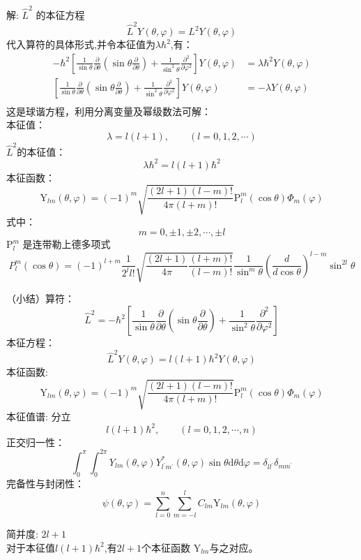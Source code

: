 \begin{frame} [allowframebreaks=]
    \alert{解:} $\hat{L}^2$ 的本征方程
    $$\hat{L}^2Y(\theta,\varphi)=L^2 Y(\theta,\varphi)$$
    代入算符的具体形式,并令本征值为$\lambda\hbar^2$,有：
    \begin{equation*}
        \begin{split}
            -\hbar^{2}\left[\frac{1}{\sin \theta} \frac{\partial}{\partial \theta}\left(\sin \theta \frac{\partial}{\partial \theta}\right)+\frac{1}{\sin ^{2} \theta} \frac{\partial^{2}}{\partial \varphi^{2}}\right] Y(\theta,\varphi)&=\lambda\hbar^2 Y(\theta,\varphi) \\
            \left[\frac{1}{\sin \theta} \frac{\partial}{\partial \theta}\left(\sin \theta \frac{\partial}{\partial \theta}\right)+\frac{1}{\sin ^{2} \theta} \frac{\partial^{2}}{\partial \varphi^{2}}\right] Y(\theta,\varphi)&=-\lambda Y(\theta,\varphi) \\
        \end{split} 
    \end{equation*}
    这是球谐方程，利用分离变量及幂级数法可解：\\
    本征值： $$\lambda=l(l+1), \qquad (l= 0,1,2,\cdots)$$
    $\hat{L}^2$的本征值：$$\lambda\hbar^2=l(l+1)\hbar^2$$
    本征函数：
    $$
    \mathrm{Y}_{l m}(\theta, \varphi)=(-1)^{m} \sqrt{\frac{(2 l+1)(l-m) !}{4 \pi(l+m) !}} \mathrm{P}_{l}^{m}(\cos \theta) \Phi_{m}(\varphi)
    $$ 
    式中：
    $$ m=0,\pm 1,  \pm 2, \cdots, \pm l  $$
    $\mathrm{P}_{l}^{m} $ 是连带勒上德多项式
    $$
    P_{l}^{m}(\cos \theta)=(-1)^{l+m} \frac{1}{2^{l} l !} \sqrt{\frac{(2 l+1)}{4 \pi} \frac{(l+m) !}{(l-m) !} } \frac{1}{\sin ^{m} \theta}\left(\frac{d}{d \cos \theta}\right)^{l-m} \sin ^{2 l} \theta
    $$
\end{frame} 

\begin{frame} [allowframebreaks=]
    （小结）算符：  $$ \hat{L}^{2}=-\hbar^{2}\left[\frac{1}{\sin \theta} \frac{\partial}{\partial \theta}\left(\sin \theta \frac{\partial}{\partial \theta}\right)+\frac{1}{\sin ^{2} \theta} \frac{\partial^{2}}{\partial \varphi^{2}}\right] $$
    本征方程： $$\hat{L}^2Y(\theta,\varphi)=l(l+1)\hbar^2 Y(\theta,\varphi)$$
    本征函数:     $$
    \mathrm{Y}_{l m}(\theta, \varphi)=(-1)^{m} \sqrt{\frac{(2 l+1)(l-m) !}{4 \pi(l+m) !}} \mathrm{P}_{l}^{m}(\cos \theta) \Phi_{m}(\varphi)
    $$ 
    本征值谱:  分立
    $$l(l+1)\hbar^2, \qquad (l= 0,1,2,\cdots, n) $$
    正交归一性：
    $$
    \int_{0}^{\pi} \int_{0}^{2 \pi} Y_{l m}(\theta, \varphi) Y_{l^{\prime} m^{\prime}}^{*}(\theta, \varphi) \sin \theta \mathrm{d} \theta \mathrm{d} \varphi=\delta_{l l^{\prime}} \delta_{m m^{\prime}}
    $$
    完备性与封闭性：
    $$\psi(\theta, \varphi)=\sum_{l=0}^{n} \sum_{m=-l}^{l} C_{l m} \mathrm{Y}_{l m}(\theta, \varphi)$$

    简并度: $2l+1$\\
    对于本征值$l(l+1)\hbar^2$,有$2l+1$个本征函数 $\mathrm{Y}_{l m}$与之对应。
\end{frame} 

